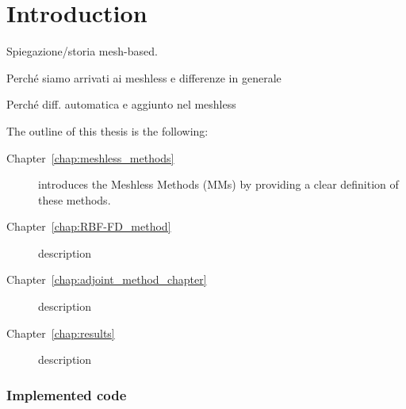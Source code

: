 \chapter{Introduction}
Spiegazione/storia mesh-based.

Perché siamo arrivati ai meshless e differenze in generale

Perché diff. automatica e aggiunto nel meshless



The outline of this thesis is the following:
\begin{description}
	\item[Chapter~\ref{chap:meshless_methods}] introduces the Meshless Methods (MMs) by providing a clear definition of these methods.
	\item[Chapter~\ref{chap:RBF-FD_method}] description
	\item[Chapter~\ref{chap:adjoint_method_chapter}] description
	\item[Chapter~\ref{chap:results}] description
\end{description}

\subsection{Implemented code}
